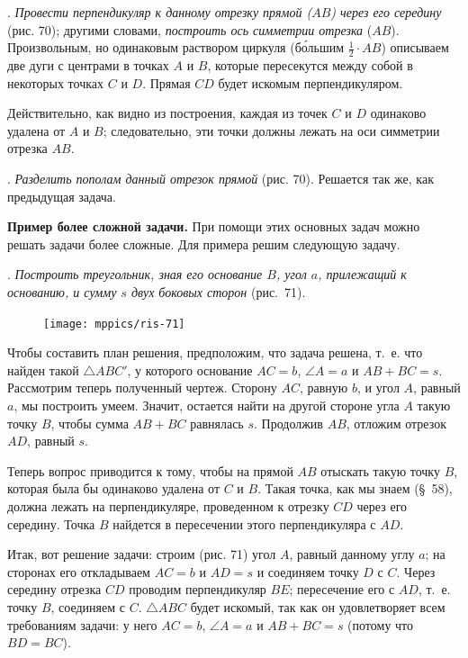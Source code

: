 \documentclass[oneside]{book}
\begin{document}
.
\emph{Провести перпендикуляр к данному отрезку прямой \emph{($AB$)} через его середину} (рис. 70);
другими словами, \emph{построить ось симметрии отрезка} ($AB$).
Произвольным, но одинаковым раствором циркуля (б\'{о}льшим $\tfrac12\cdot AB$) описываем две дуги с центрами в точках $A$ и $B$, которые пересекутся между собой в некоторых точках $C$ и $D$.
Прямая $CD$ будет искомым перпендикуляром.

Действительно, как видно из построения, каждая из точек $C$ и $D$ одинаково удалена от $A$ и $B$;
следовательно, эти точки должны лежать на оси симметрии отрезка $AB$.

.
\emph{Разделить пополам данный отрезок прямой} (рис. 70).
Решается так же, как предыдущая задача.

\textbf{Пример более сложной задачи.}
При помощи этих основных задач можно решать задачи более сложные.
Для примера решим следующую задачу.

.
\emph{Построить треугольник, зная его основание $B$, угол $a$, прилежащий к основанию, и сумму $s$ двух боковых сторон} (рис.~71).

\begin{figure}[h!]
\centering
\texttt{[image: mppics/ris-71]}
\caption{}
\end{figure}

Чтобы составить план решения, предположим, что задача решена, т.~е. что найден такой $\triangle ABC'$, у которого основание $AC = b$, $\angle A=a$ и $AB+BC=s$.
Рассмотрим теперь полученный чертеж.
Сторону $AC$, равную $b$, и угол $A$, равный $a$, мы построить умеем.
Значит, остается найти на другой стороне угла $A$ такую точку $B$, чтобы сумма $AB+BC$ равнялась $s$.
Продолжив $AB$, отложим отрезок $AD$, равный $s$.

Теперь вопрос приводится к тому, чтобы на прямой $AB$ отыскать такую точку $B$, которая была бы одинаково удалена от $C$ и $B$.
Такая точка, как мы знаем (§~58), должна лежать на перпендикуляре, проведенном к отрезку $CD$ через его середину.
Точка $B$ найдется в пересечении этого перпендикуляра с $AD$.

Итак, вот решение задачи:
строим (рис. 71) угол $A$, равный данному углу $a$;
на сторонах его откладываем $AC=b$ и $AD=s$ и соединяем точку $D$ с $C$.
Через середину отрезка $CD$ проводим перпендикуляр $BE$;
пересечение его с $AD$, т.~е. точку $B$, соединяем с $C$.
$\triangle ABC$ будет  искомый, так как он удовлетворяет всем требованиям задачи:
у него $AC=b$, $\angle A = a$ и $AB+BC=s$ (потому что $BD=BC$).
\end{document}
